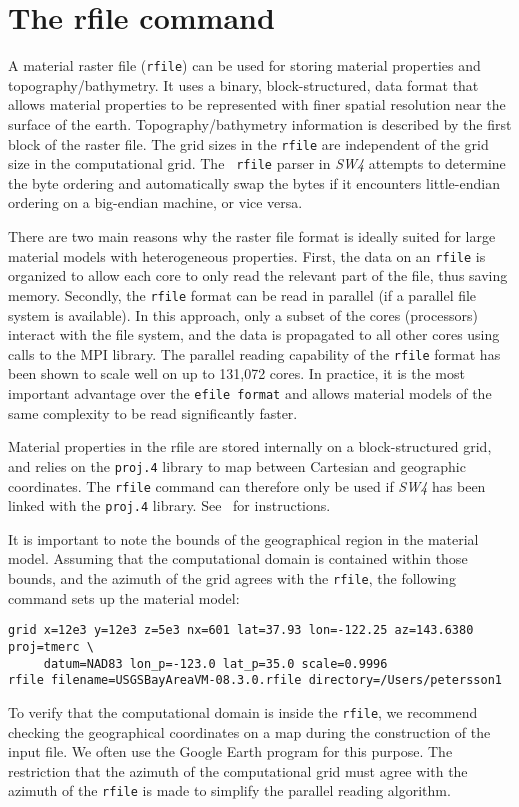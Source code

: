 \documentclass[11pt]{report}
\begin{document}
\section{The rfile command} \label{sec:rfile-mat}

A material raster file ({\tt rfile}) can be used for storing material properties and
topography/bathymetry. It uses a binary, block-structured, data format that allows material
properties to be represented with finer spatial resolution near the surface of the
earth. Topography/bathymetry information is described by the first block of the raster file. The
grid sizes in the {\tt rfile} are independent of the grid size in the computational grid. The {\tt
  rfile} parser in \emph{SW4} attempts to determine the byte ordering and automatically swap the
bytes if it encounters little-endian ordering on a big-endian machine, or vice versa.

There are two main reasons why the raster file format is ideally suited for large material models
with heterogeneous properties. First, the data on an {\tt rfile} is organized to allow each core to
only read the relevant part of the file, thus saving memory. Secondly, the {\tt rfile} format can be
read in parallel (if a parallel file system is available). In this approach, only a subset of the
cores (processors) interact with the file system, and the data is propagated to all other cores
using calls to the MPI library. The parallel reading capability of the {\tt rfile}
format has been shown to scale well on up to 131,072 cores. In practice, it is the most important
advantage over the {\tt efile format} and allows material models of the same complexity to be read
significantly faster. 

Material properties in the rfile are stored internally on a block-structured grid, and relies on the
\verb+proj.4+ library to map between Cartesian and geographic coordinates. The {\tt rfile} command
can therefore only be used if \emph{SW4} has been linked with the \verb+proj.4+
library. See~\cite{SW4-install} for instructions.

It is important to note the bounds of the geographical region in the material model. Assuming that
the computational domain is contained within those bounds, and the azimuth of the grid agrees with
the \verb+rfile+, the following command sets up the material model:
\begin{verbatim}
grid x=12e3 y=12e3 z=5e3 nx=601 lat=37.93 lon=-122.25 az=143.6380 proj=tmerc \
     datum=NAD83 lon_p=-123.0 lat_p=35.0 scale=0.9996
rfile filename=USGSBayAreaVM-08.3.0.rfile directory=/Users/petersson1
\end{verbatim}
To verify that the computational domain is inside the \verb+rfile+, we recommend checking the
geographical coordinates on a map during the construction of the input file. We often use the Google Earth
program for this purpose. The restriction that the azimuth of the computational grid
must agree with the azimuth of the \verb+rfile+ is made to simplify the parallel reading algorithm.
\end{document}
